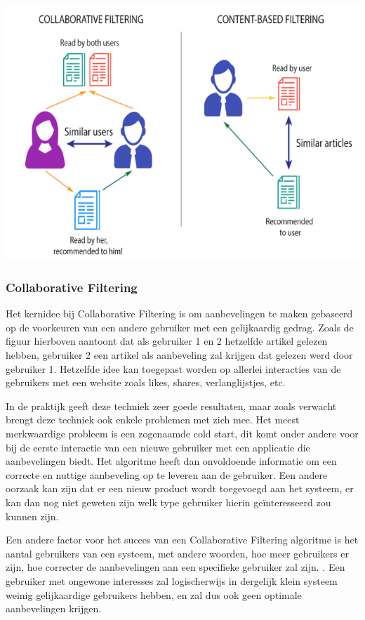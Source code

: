 	\includegraphics[width=\linewidth]{img/Content-based-filtering-and-Collaborative-filtering-recommendation}
	
\subsubsection{Collaborative Filtering}
\label{sec:Collaborative Filtering}

Het kernidee bij Collaborative Filtering \autocite{Schafera} is om aanbevelingen te maken gebaseerd op de voorkeuren van een andere gebruiker met een gelijkaardig gedrag. Zoals de figuur hierboven aantoont dat als gebruiker 1 en 2 hetzelfde artikel gelezen hebben, gebruiker 2 een artikel als aanbeveling zal krijgen dat gelezen werd door gebruiker 1. 
Hetzelfde idee kan toegepast worden op allerlei interacties van de gebruikers met een website zoals likes, shares, verlanglijstjes, etc.

In de praktijk geeft deze techniek zeer goede resultaten, maar zoals verwacht brengt deze techniek ook enkele problemen met zich mee. Het meest merkwaardige probleem is een zogenaamde cold start, dit komt onder andere voor bij de eerste interactie van een nieuwe gebruiker met een applicatie die aanbevelingen biedt. Het algoritme heeft dan onvoldoende informatie om een correcte en nuttige aanbeveling op te leveren aan de gebruiker. Een andere oorzaak kan zijn dat er een nieuw product wordt toegevoegd aan het systeem, er kan dan nog niet geweten zijn welk type gebruiker hierin geïnteresseerd zou kunnen zijn. 

Een andere factor voor het succes van een Collaborative Filtering algoritme is het aantal gebruikers van een systeem, met andere woorden, hoe meer gebruikers er zijn, hoe correcter de aanbevelingen aan een specifieke gebruiker zal zijn. \autocite{Sarwar2001}. Een gebruiker met ongewone interesses zal logischerwijs in dergelijk klein systeem weinig gelijkaardige gebruikers hebben, en zal dus ook geen optimale aanbevelingen krijgen.


